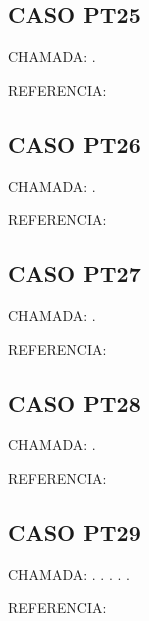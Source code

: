 \documentclass{undftex}
\begin{document}
\begin{refsection}\section*{CASO PT25} CHAMADA: . \textcite{pt25}\par REFERENCIA:\par\printbibliography[heading=none,check=undfconsultadas]\end{refsection}\clearpage
\begin{refsection}\section*{CASO PT26} CHAMADA: . \textcite{pt26}\par REFERENCIA:\par\printbibliography[heading=none,check=undfconsultadas]\end{refsection}\clearpage
\begin{refsection}\section*{CASO PT27} CHAMADA: . \textcite{pt27b}\par REFERENCIA:\par\printbibliography[heading=none,check=undfconsultadas]\end{refsection}\clearpage
\begin{refsection}\section*{CASO PT28} CHAMADA: . \textcite{pt27a}\par REFERENCIA:\par\printbibliography[heading=none,check=undfconsultadas]\end{refsection}\clearpage
\begin{refsection}\section*{CASO PT29} CHAMADA: . \textcite{pt27b}. . . . \par REFERENCIA:\par\printbibliography[heading=none,check=undfconsultadas]\end{refsection}\clearpage
\end{document}
